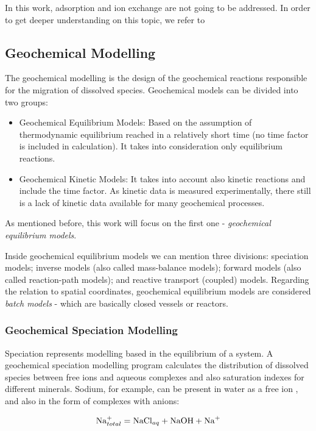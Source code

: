 \documentclass[ppgc,mestrado,English]{iiufrgs}
\begin{document}
In this work, adsorption and ion exchange are not going to be addressed. In order to get deeper understanding on this topic, we refer to \cite{Freeze:79}

\subsection{Geochemical Modelling}
The geochemical modelling is the design of the geochemical reactions responsible for the migration of dissolved species. Geochemical models can be divided into two groups:
\begin{itemize}
\item Geochemical Equilibrium Models: Based on the assumption of thermodynamic equilibrium reached in a relatively short time (no time factor is included in calculation). It takes into consideration only equilibrium reactions.
\item Geochemical Kinetic Models: It takes into account also kinetic reactions and include the time factor. As kinetic data is measured experimentally, there still is a lack of kinetic data available for many geochemical processes. 
\end{itemize}

As mentioned before, this work will focus on the first one - \emph{geochemical equilibrium models}.

Inside geochemical equilibrium models we can mention three divisions: speciation models; inverse models (also called mass-balance models); forward models (also called reaction-path models); and reactive transport (coupled) models. Regarding the relation to spatial coordinates, geochemical equilibrium models are considered \emph{batch models} - which are basically closed vessels or reactors.

\subsubsection{Geochemical Speciation Modelling}
Speciation represents modelling based in the equilibrium of a system. A geochemical speciation modelling program calculates the distribution of dissolved species between free ions and aqueous complexes and also saturation indexes for different minerals. Sodium, for example, can be present in water as a free ion , and also in the form of complexes with anions:

\begin{equation}
\ce{Na^+}_{total} = \ce{NaCl}_{aq} + \ce{NaOH} + \ce{Na^+}
\end{equation}
\end{document}
